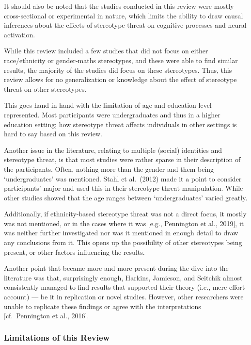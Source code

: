 \documentclass[
  stu, a4paper,floatsintext]{apa7}
\begin{document}
It should also be noted that the studies conducted in this review were mostly cross-sectional or experimental in nature, which limits the ability to draw causal inferences about the effects of stereotype threat on cognitive processes and neural activation.

While this review included a few studies that did not focus on either race/ethnicity or gender-maths stereotypes, and these were able to find similar results, the majority of the studies did focus on these stereotypes. Thus, this review allows for no generalization or knowledge about the effect of stereotype threat on other stereotypes.

This goes hand in hand with the limitation of age and education level represented. Most participants were undergraduates and thus in a higher education setting; how stereotype threat affects individuals in other settings is hard to say based on this review.

Another issue in the literature, relating to multiple (social) identities and stereotype threat, is that most studies were rather sparse in their description of the participants. Often, nothing more than the gender and them being `undergraduates' was mentioned. Stahl et al.~(2012) made it a point to consider participants' major and used this in their stereotype threat manipulation. While other studies showed that the age ranges between `undergraduates' varied greatly.

Additionally, if ethnicity-based stereotype threat was not a direct focus, it mostly was not mentioned, or in the cases where it was {[}e.g., Pennington et al., 2019{]}, it was neither further investigated nor was it mentioned in enough detail to draw any conclusions from it. This opens up the possibility of other stereotypes being present, or other factors influencing the results.

Another point that became more and more present during the dive into the literature was that, surprisingly enough, Harkins, Jamieson, and Seitchik almost consistently managed to find results that supported their theory (i.e., mere effort account) --- be it in replication or novel studies. However, other researchers were unable to replicate these findings or agree with the interpretations {[}cf.~Pennington et al., 2016{]}.

\subsubsection{Limitations of this Review}\label{limitations-of-this-review}
\end{document}
